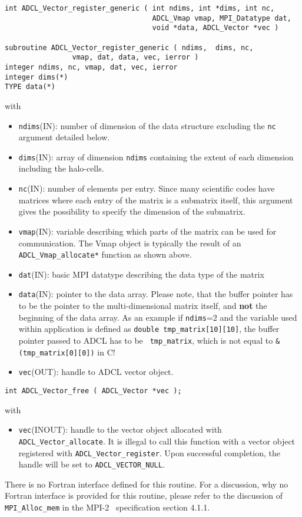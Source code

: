 \hspace{1cm}
\begin{verbatim}
int ADCL_Vector_register_generic ( int ndims, int *dims, int nc, 
                                   ADCL_Vmap vmap, MPI_Datatype dat, 
                                   void *data, ADCL_Vector *vec )

subroutine ADCL_Vector_register_generic ( ndims,  dims, nc, 
                vmap, dat, data, vec, ierror )
integer ndims, nc, vmap, dat, vec, ierror
integer dims(*)
TYPE data(*)
\end{verbatim}
with
\begin{itemize}
\item {\tt ndims}(IN): number of dimension of the data structure excluding the
  {\tt nc} argument detailed below.
\item {\tt dims}(IN): array of dimension {\tt ndims} containing the extent of
  each dimension including the halo-cells.
\item {\tt nc}(IN): number of elements per entry. Since many scientific codes
  have matrices where each entry of the matrix is a submatrix itself, this
  argument gives the possibility to specify the dimension of the submatrix.
\item {\tt vmap}(IN): variable describing which parts of the matrix can be
  used for communication. The Vmap object is typically the result of an {\tt
    ADCL\_Vmap\_allocate*} function as shown above.
\item {\tt dat}(IN): basic MPI datatype describing the data type of the matrix
\item {\tt data}(IN): pointer to the data array. Please note, that the buffer
  pointer has to be the pointer to the multi-dimensional matrix itself, and
  {\bf not} the beginning of the data array. As an example if {\tt ndims}=2
  and the variable used within application is defined as {\tt double
    tmp\_matrix[10][10]}, the buffer pointer passed to ADCL has to be {\tt
    tmp\_matrix}, which is not equal to {\tt \&(tmp\_matrix[0][0])} in C!
\item {\tt vec}(OUT): handle to ADCL vector object.
\end{itemize}

\hspace{1cm}

\begin{verbatim}
int ADCL_Vector_free ( ADCL_Vector *vec );
\end{verbatim}
with
\begin{itemize}
\item {\tt vec}(INOUT): handle to the vector object allocated with {\tt
    ADCL\_Vector\-\_allocate}. It is illegal to call this function with a
  vector object registered with {\tt ADCL\_Vector\_register}. Upon successful
  completion, the handle will be set to {\tt ADCL\_VECTOR\_NULL}.
\end{itemize}
There is no Fortran interface defined for this routine. For a discussion, why
no Fortran interface is provided for this routine, please refer to the
discussion of {\tt MPI\_Alloc\_mem} in the MPI-2~\cite{mpi2} specification
section 4.1.1.  \hspace{1cm}

